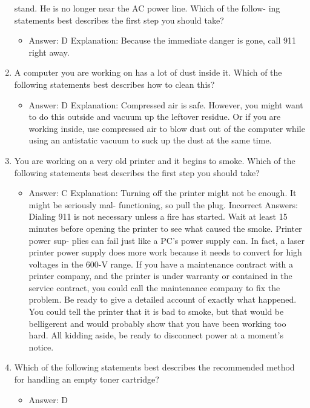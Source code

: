 \documentclass{article}
\begin{document}
\begin{enumerate}
stand. He is no longer near the AC power line. Which of the follow-
ing statements best describes the first step you should take?
     \begin{itemize}
         \item Answer: D
Explanation: Because the immediate danger is gone, call 911 right away.
     \end{itemize}
      \item A computer you are working on has a lot of dust inside it. Which
of the following statements best describes how to clean this?
     \begin{itemize}
         \item Answer: D
Explanation: Compressed air is safe. However, you might want to do this outside and
vacuum up the leftover residue. Or if you are working inside, use compressed air to
blow dust out of the computer while using an antistatic vacuum to suck up the dust at
the same time.
     \end{itemize}
      \item You are working on a very old printer and it begins to smoke.
Which of the following statements best describes the first step you
should take?
     \begin{itemize}
         \item Answer: C
Explanation: Turning off the printer might not be enough. It might be seriously mal-
functioning, so pull the plug.
Incorrect Answers: Dialing 911 is not necessary unless a fire has started. Wait at least
15 minutes before opening the printer to see what caused the smoke. Printer power sup-
plies can fail just like a PC’s power supply can. In fact, a laser printer power supply does
more work because it needs to convert for high voltages in the 600-V range. If you have a
maintenance contract with a printer company, and the printer is under warranty or contained
in the service contract, you could call the maintenance company to fix the problem. Be
ready to give a detailed account of exactly what happened. You could tell the printer that it
is bad to smoke, but that would be belligerent and would probably show that you have been
working too hard. All kidding aside, be ready to disconnect power at a moment’s notice.
     \end{itemize}
      \item Which of the following statements best describes the recommended
method for handling an empty toner cartridge?
     \begin{itemize}
         \item Answer: D

\end{itemize}
\end{enumerate}
\end{document}
